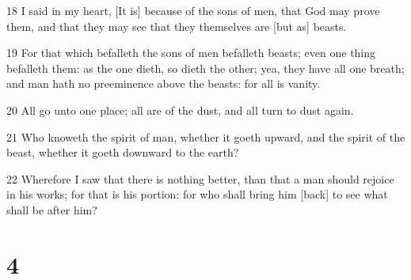 \par 18 I said in my heart, [It is] because of the sons of men, that God may prove them, and that they may see that they themselves are [but as] beasts.
\par 19 For that which befalleth the sons of men befalleth beasts; even one thing befalleth them: as the one dieth, so dieth the other; yea, they have all one breath; and man hath no preeminence above the beasts: for all is vanity.
\par 20 All go unto one place; all are of the dust, and all turn to dust again.
\par 21 Who knoweth the spirit of man, whether it goeth upward, and the spirit of the beast, whether it goeth downward to the earth?
\par 22 Wherefore I saw that there is nothing better, than that a man should rejoice in his works; for that is his portion: for who shall bring him [back] to see what shall be after him?

\chapter{4}

